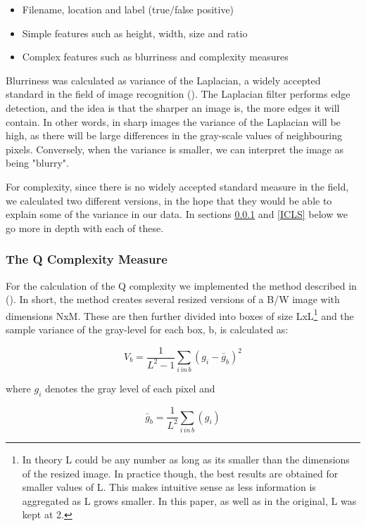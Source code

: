 \documentclass[12pt]{article}
\begin{document}
\begin{itemize}
	\item Filename, location and label (true/false positive)
	\item Simple features such as height, width, size and ratio
	\item Complex features such as blurriness and complexity measures
\end{itemize}

Blurriness was calculated as variance of the Laplacian, a widely accepted standard in the field of image recognition (\cite{bansalBlurImageDetection2016}). The Laplacian filter performs edge detection, and the idea is that the sharper an image is, the more edges it will contain. In other words, in sharp images the variance of the Laplacian will be high, as there will be large differences in the gray-scale values of neighbouring pixels. Conversely, when the variance is smaller, we can interpret the image as being "blurry".

For complexity, since there is no widely accepted standard measure in the field, we calculated two different versions, in the hope that they would be able to explain some of the variance in our data. In sections \ref{Q} and \ref{ICLS} below we go more in depth with each of these.

\subsubsection{The Q Complexity Measure}\label{Q}
For the calculation of the Q complexity we implemented the method described in (\cite{zanetteQuantifyingComplexityBlackandwhite2018}). In short, the method creates several resized versions of a B/W image with dimensions NxM. These are then further divided into boxes of size LxL\footnote{In theory L could be any number as long as its smaller than the dimensions of the resized image. In practice though, the best results are obtained for smaller values of L. This makes intuitive sense as less information is aggregated as L grows smaller. In this paper, as well as in the original, L was kept at 2.} and the sample variance of the gray-level for each box, b, is calculated as: 

\begin{equation}
	V_b = \frac{1}{L^2-1}\sum_{i\,in\,b}(g_i-\bar{g}_b)^2
	\label{eq:Q1}
\end{equation} 

where $g_i$ denotes the gray level of each pixel and

\begin{equation}
	\bar{g}_b = \frac{1}{L^2}\sum_{i\,in\,b}(g_i)
	\label{eq:Q2}
\end{equation} 
\end{document}
